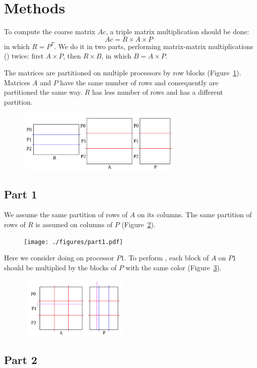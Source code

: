 \section{Methods}
\label{sec:methods}

To compute the coarse matrix $Ac$, a triple matrix multiplication should be done:
\begin{equation}
 Ac = R \times A \times P
\end{equation}
in which $R = P^T$. We do it in two parts, performing matrix-matrix multiplications (\matmult) twice: first $A \times P$, then $R \times B$, in which $B = A \times P$.

The matrices are partitioned on multiple processors by row blocks (Figure~\ref{fig:partition}). Matrices $A$ and $P$ have the same number of rows and consequently are partitioned the same way. $R$ has less number of rows and has a different partition.

\begin{figure}[tbh]
 \centering
 \includegraphics[width=8cm,height=3cm]{./figures/partition.pdf}
 \caption{}
 \label{fig:partition}
\end{figure}

\subsection{Part 1}

We assume the same partition of rows of $A$ on its columns. The same partition of rows of $R$ is assumed on columns of $P$ (Figure~\ref{fig:part1}).

\begin{figure}[tbh]
 \centering
 \texttt{[image: ./figures/part1.pdf]}
 \caption{}
 \label{fig:part1}
\end{figure}

Here we consider doing \matmult on processor $P1$. To perform \matmult, each block of $A$ on $P1$ should be multiplied by the blocks of $P$ with the same color (Figure~\ref{fig:part1b}).

\begin{figure}[tbh]
 \centering
 \includegraphics[width=5.5cm,height=3cm]{./figures/part1b.pdf}
 \caption{}
 \label{fig:part1b}
\end{figure}


\subsection{Part 2}
